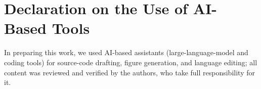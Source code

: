 \documentclass[runningheads]{llncs}
\begin{document}
\section*{Declaration on the Use of AI-Based Tools}
In preparing this work, we used AI-based assistants (large-language-model and coding
tools) for source-code drafting, figure generation, and language editing; all content
was reviewed and verified by the authors, who take full responsibility for it.



\end{document}
